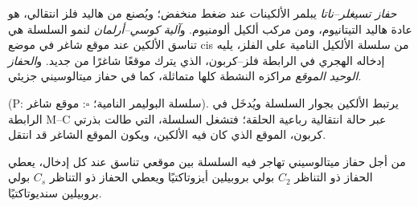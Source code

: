 \begin{definition}\label{def:b3:homogeneous-catalysis:ziegler-natta}
\emph{حفاز تسيغلر--ناتا} يبلمر
الألكينات عند ضغط منخفض؛ ويُصنع من هاليد فلز انتقالي، هو عادة
هاليد التيتانيوم، ومن مركب ألكيل ألومنيوم. و\emph{آلية كوسي--أرلمان}
لنمو السلسلة هي تناسق
الألكين عند موقع شاغر في موضع cis من سلسلة الألكيل النامية على الفلز،
يليه إدخاله الهجري في الرابطة فلز--كربون، الذي يترك
موقعًا شاغرًا من جديد. و\emph{الحفاز الوحيد الموقع}
مراكزه النشطة كلها متماثلة، كما في حفاز ميتالوسيني جزيئي.
\end{definition}

\begin{omfigure}
\par\medskip

{\small {} (P: سلسلة البوليمر النامية؛ $\square$: موقع
شاغر). يرتبط الألكين بجوار السلسلة ويُدخَل في الرابطة M--C
عبر حالة انتقالية رباعية الحلقة؛ فتشغل السلسلة، التي طالت بذرتي
كربون، الموقع الذي كان فيه الألكين، ويكون الموقع الشاغر قد
انتقل.}
\end{omfigure}

\begin{proposition}\label{prop:b3:homogeneous-catalysis:tacticity-symmetry}
من أجل حفاز ميتالوسيني تهاجر فيه السلسلة بين موقعي تناسق
عند كل إدخال، يعطي الحفاز ذو التناظر $C_2$ بولي بروبيلين أيزوتاكتيًا
ويعطي الحفاز ذو التناظر $C_s$ بولي بروبيلين سنديوتاكتيًا.
\end{proposition}

